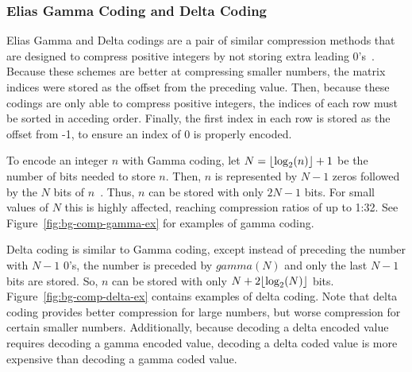 \subsubsection{Elias Gamma Coding and Delta Coding}
Elias Gamma and Delta codings are a pair of similar compression methods that are designed to compress positive integers by not storing extra leading 0's~\cite{Elias:1975:codeword}.
Because these schemes are better at compressing smaller numbers, the matrix indices were stored as the offset from the preceding value.
Then, because these codings are only able to compress positive integers, the indices of each row must be sorted in acceding order.
Finally, the first index in each row is stored as the offset from -1, to ensure an index of 0 is properly encoded.

To encode an integer \(n\) with Gamma coding, let \(N = \lfloor\log_2(n)\rfloor+1\) be the number of bits needed to store \(n\).
Then, \(n\) is represented by \(N-1\) zeros followed by the \(N\) bits of \(n\)~\cite{Elias:1975:codeword}.
Thus, \(n\) can be stored with only \(2N-1\) bits.
For small values of \(N\) this is highly affected, reaching compression ratios of up to 1:32.
See Figure~\ref{fig:bg-comp-gamma-ex} for examples of gamma coding.



Delta coding is similar to Gamma coding, except instead of preceding the number with \(N-1\) 0's, the number is preceded by \(gamma(N)\) and only the last \(N-1\) bits are stored.
So, \(n\) can be stored with only \(N + 2\lfloor\log_2(N)\rfloor\) bits.
Figure~\ref{fig:bg-comp-delta-ex} contains examples of delta coding.
Note that delta coding provides better compression for large numbers, but worse compression for certain smaller numbers.
Additionally, because decoding a delta encoded value requires decoding a gamma encoded value, decoding a delta coded value is more expensive than decoding a gamma coded value.




